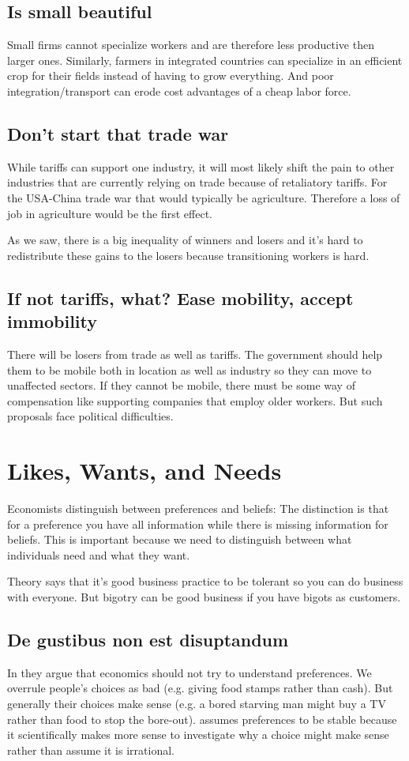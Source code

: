 \documentclass[a4paper, twocolumn]{article}
\begin{document}
\subsection{Is small beautiful}
Small firms cannot specialize workers and are therefore less productive then larger ones. Similarly, farmers in integrated countries can specialize in an efficient crop for their fields instead of having to grow everything. And poor integration/transport can erode cost advantages of a cheap labor force. 

\subsection{Don't start that trade war}
While tariffs can support one industry, it will most likely shift the pain to other industries that are currently relying on trade because of retaliatory tariffs. For the USA-China trade war that would typically be agriculture. Therefore a loss of job in agriculture would be the first effect.

As we saw, there is a big inequality of winners and losers and it's hard to redistribute these gains to the losers because transitioning workers is hard. 

\subsection{If not tariffs, what? Ease mobility, accept immobility}
There will be losers from trade as well as tariffs. The government should help them to be mobile both in location as well as industry so they can move to unaffected sectors. If they cannot be mobile, there must be some way of compensation like supporting companies that employ older workers. But such proposals face political difficulties.


\section{Likes, Wants, and Needs}
Economists distinguish between preferences and beliefs: The distinction is that for a preference you have all information while there is missing information for beliefs. This is important because we need to distinguish between what individuals need and what they want.

Theory says that it's good business practice to be tolerant so you can do business with everyone. But bigotry can be good business if you have bigots as customers.

\subsection{De gustibus non est disuptandum}
In \cite{de-gustibus} they argue that economics should not try to understand preferences. We overrule people's choices as bad (e.g. giving food stamps rather than cash). But generally their choices make sense (e.g. a bored starving man might buy a TV rather than food to stop the bore-out). \cite{de-gustibus} assumes preferences to be stable because it scientifically makes more sense to investigate why a choice might make sense rather than assume it is irrational.
\end{document}
